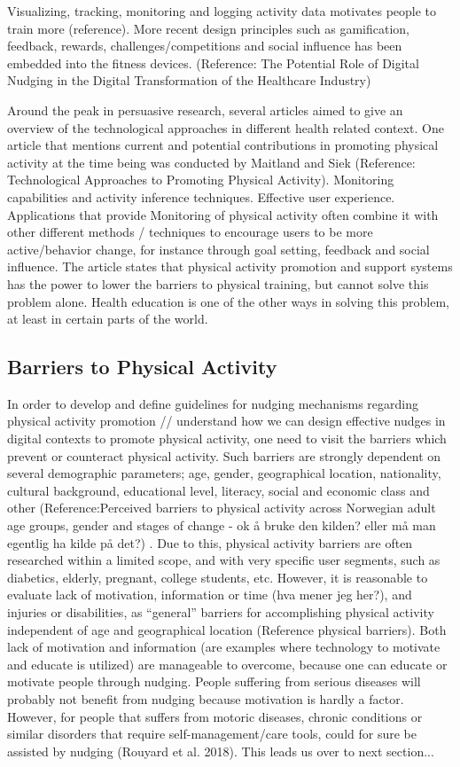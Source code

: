 Visualizing, tracking, monitoring and logging activity data motivates people to train more (reference). More recent design principles such as gamification, feedback, rewards, challenges/competitions and social influence has been embedded into the fitness devices. (Reference: The Potential Role of Digital Nudging in the Digital Transformation of the Healthcare Industry)
 
Around the peak in persuasive research, several articles aimed to give an overview of the technological approaches in different health related context. One article that mentions current and potential contributions in promoting physical activity at the time being was conducted by Maitland and Siek (Reference: Technological Approaches to Promoting Physical Activity). Monitoring capabilities and activity inference techniques. Effective user experience. Applications that provide Monitoring of physical activity often combine it with other different methods / techniques to encourage users to be more active/behavior change, for instance through goal setting, feedback and social influence.  The article states that physical activity promotion and support systems has the power to lower the barriers to physical training, but cannot solve this problem alone. Health education is one of the other ways in solving this problem, at least in certain parts of the world. 

\subsection{Barriers to Physical Activity} 
In order to develop and define guidelines for nudging mechanisms regarding physical activity promotion // understand how we can design effective nudges in digital contexts to promote physical activity, one need to visit the barriers which prevent or counteract physical activity. Such barriers are strongly dependent on several demographic parameters; age, gender, geographical location, nationality, cultural background, educational level, literacy, social and economic class and other (Reference:Perceived barriers to physical activity across Norwegian adult age groups, gender and stages of change - ok å bruke den kilden? eller må man egentlig ha kilde på det?) . Due to this, physical activity barriers are often researched within a limited scope, and with very specific user segments, such as diabetics, elderly, pregnant, college students, etc. However, it is reasonable to evaluate lack of motivation, information or time (hva mener jeg her?), and injuries or disabilities, as “general” barriers for accomplishing physical activity independent of age and geographical location (Reference physical barriers). Both lack of motivation and information (are examples where technology to motivate and educate is utilized) are manageable to overcome, because one can educate or motivate people through nudging. People suffering from serious diseases will probably not benefit from nudging because motivation is hardly a factor. However, for people that suffers from motoric diseases, chronic conditions or similar disorders that require self-management/care tools, could for sure be assisted by nudging (Rouyard et al. 2018). This leads us over to next section... 

